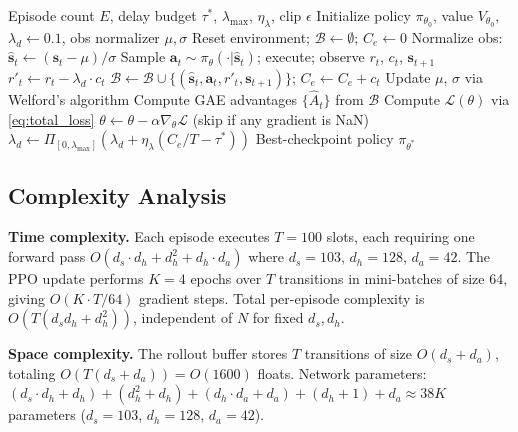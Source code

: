 \documentclass[journal]{IEEEtran}
\newcommand{\ld}{\lambda_d}
\begin{document}
\begin{algorithm}[!t]
\caption{DC-PPO: Dual-Constrained PPO}
\label{alg:dcppo}
\begin{algorithmic}[1]
\REQUIRE Episode count $E$, delay budget $\tau^*$,
         $\lambda_{\max}$, $\eta_\lambda$, clip $\epsilon$
\STATE Initialize policy $\pi_{\theta_0}$, value $V_{\theta_0}$,
       $\ld \leftarrow 0.1$, obs normalizer $\mu, \sigma$
  \STATE Reset environment; $\mathcal{B} \leftarrow \emptyset$;
         $C_e \leftarrow 0$
    \STATE Normalize obs: $\hat{\bm{s}}_t \leftarrow
           (\bm{s}_t - \mu)/\sigma$
    \STATE Sample $\bm{a}_t \sim \pi_\theta(\cdot|\hat{\bm{s}}_t)$;
           execute; observe $r_t$, $c_t$, $\bm{s}_{t+1}$
    \STATE $r'_t \leftarrow r_t - \ld \cdot c_t$
    \STATE $\mathcal{B} \leftarrow \mathcal{B} \cup
           \{(\hat{\bm{s}}_t, \bm{a}_t, r'_t, \bm{s}_{t+1})\}$;
           $C_e \leftarrow C_e + c_t$
    \STATE Update $\mu$, $\sigma$ via Welford's algorithm
  \ENDFOR
  \STATE Compute GAE advantages $\{\hat{A}_t\}$ from $\mathcal{B}$
     
      \STATE Compute $\mathcal{L}(\theta)$ via \eqref{eq:total_loss}
      \STATE $\theta \leftarrow \theta - \alpha \nabla_\theta \mathcal{L}$
             (skip if any gradient is NaN)
    \ENDFOR
  \ENDFOR
  \STATE $\ld \leftarrow \Pi_{[0,\lambda_{\max}]}
         \!\left(\ld + \eta_\lambda (C_e/T - \tau^*)\right)$
\ENDFOR
\RETURN Best-checkpoint policy $\pi_{\theta^*}$
\end{algorithmic}
\end{algorithm}

\subsection{Complexity Analysis}

\textbf{Time complexity.}
Each episode executes $T = 100$ slots, each requiring one forward
pass $O(d_s \cdot d_h + d_h^2 + d_h \cdot d_a)$ where $d_s = 103$,
$d_h = 128$, $d_a = 42$.
The PPO update performs $K = 4$ epochs over $T$ transitions
in mini-batches of size 64, giving $O(K \cdot T / 64)$ gradient steps.
Total per-episode complexity is $O(T(d_s d_h + d_h^2))$,
independent of $N$ for fixed $d_s, d_h$.

\textbf{Space complexity.}
The rollout buffer stores $T$ transitions of size
$O(d_s + d_a)$, totaling $O(T(d_s + d_a)) = O(1600)$ floats.
Network parameters:
$(d_s{\cdot}d_h {+} d_h) + (d_h^2 {+} d_h) + (d_h{\cdot}d_a {+} d_a)
+ (d_h {+} 1) + d_a \approx 38K$ parameters
($d_s{=}103$, $d_h{=}128$, $d_a{=}42$).
\end{document}
